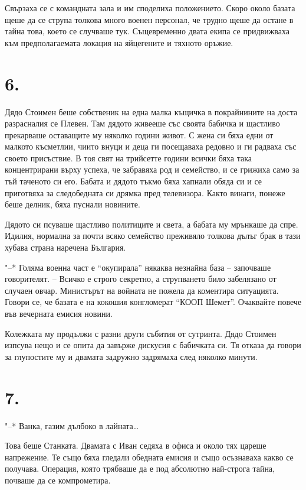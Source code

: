\documentclass[ebook,openany,12pt]{memoir}
\begin{document}
Свързаха се с командната зала и им споделиха положението. Скоро около базата щеше да се струпа толкова много военен персонал, че трудно щеше да остане в тайна това, което се случваше тук. Същевременно двата екипа се придвижваха към предполагаемата локация на яйцегените и тяхното оръжие.

\section*{6.}

Дядо Стоимен беше собственик на една малка къщичка в покрайнините на доста разрасналия се Плевен. Там дядото живееше със своята бабичка и щастливо прекарваше оставащите му няколко години живот. С жена си бяха едни от малкото късметлии, чиито внуци и деца ги посещаваха редовно и ги радваха със своето присъствие. В тоя свят на трийсетте години всички бяха така концентрирани върху успеха, че забравяха род и семейство, и се грижиха само за тъй таченото си его. Бабата и дядото тъкмо бяха хапнали обяда си и се приготвяха за следобедната си дрямка пред телевизора. Както винаги, понеже беше делник, бяха пуснали новините.

Дядото си псуваше щастливо политиците и света, а бабата му мрънкаше да спре. Идилия, нормална за почти всяко семейство преживяло толкова дълъг брак в тази хубава страна наречена България.

"--* Голяма военна част е ``окупирала'' някаква незнайна база – започваше говорителят. – Всичко е строго секретно, а струпването било забелязано от случаен овчар. Министърът на войната не пожела да коментира ситуацията. Говори се, че базата е на кокошия конгломерат ``КООП Шемет''. Очаквайте повече във вечерната емисия новини.

Колежката му продължи с разни други събития от сутринта. Дядо Стоимен изпсува нещо и се опита да завърже дискусия с бабичката си. Тя отказа да говори за глупостите му и двамата задружно задрямаха след няколко минути.

\section*{7.}

"--* Ванка, газим дълбоко в лайната\ldots

Това беше Станката. Двамата с Иван седяха в офиса и около тях цареше напрежение. Те също бяха гледали обедната емисия и също осъзнаваха какво се получава. Операция, която трябваше да е под абсолютно най-строга тайна, почваше да се компрометира. 
\end{document}
